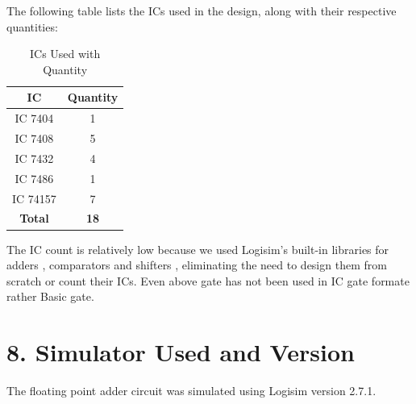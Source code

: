 \documentclass{article}
\begin{document}
The following table lists the ICs used in the design, along with their respective quantities:

\begin{table}[h!]
\centering
\begin{tabular}{|c|c|}
\hline
\textbf{IC} & \textbf{Quantity} \\ \hline
IC 7404 & 1 \\ \hline
IC 7408 & 5 \\ \hline
IC 7432 & 4 \\ \hline
IC 7486 & 1 \\ \hline
IC 74157 & 7 \\ \hline
\textbf{Total} & \textbf{18} \\ \hline
\end{tabular}
\caption{ICs Used with Quantity}
\end{table}

\noindent
The IC count is relatively low because we used Logisim's built-in libraries for adders , comparators and shifters , eliminating the need to design them from scratch or count their ICs.
Even above gate has not been used in IC gate formate rather Basic gate.
\section*{8. Simulator Used and Version}
The floating point adder circuit was simulated using Logisim version 2.7.1.
\end{document}
